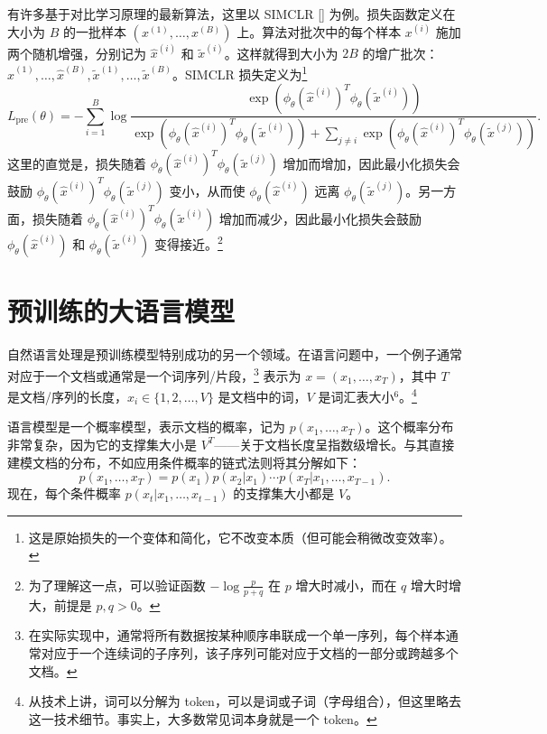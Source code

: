 有许多基于对比学习原理的最新算法，这里以 SIMCLR [\cite{chen2020simple}] 为例。损失函数定义在大小为 $B$ 的一批样本 $(x^{(1)}, \dots, x^{(B)})$ 上。算法对批次中的每个样本 $x^{(i)}$ 施加两个随机增强，分别记为 $\hat{x}^{(i)}$ 和 $\tilde{x}^{(i)}$。这样就得到大小为 $2B$ 的增广批次：$\hat{x}^{(1)}, \dots, \hat{x}^{(B)}, \tilde{x}^{(1)}, \dots, \tilde{x}^{(B)}$。SIMCLR 损失定义为\footnote{这是原始损失的一个变体和简化，它不改变本质（但可能会稍微改变效率）。
}
\[
    L_{\text{pre}}(\theta) = - \sum_{i=1}^B \log \frac{\exp(\phi_\theta(\hat{x}^{(i)})^T \phi_\theta(\tilde{x}^{(i)}))}{\exp(\phi_\theta(\hat{x}^{(i)})^T \phi_\theta(\tilde{x}^{(i)})) + \sum_{j \neq i} \exp(\phi_\theta(\hat{x}^{(i)})^T \phi_\theta(\tilde{x}^{(j)}))}.
\]
这里的直觉是，损失随着 $\phi_\theta(\hat{x}^{(i)})^T \phi_\theta(\tilde{x}^{(j)})$ 增加而增加，因此最小化损失会鼓励 $\phi_\theta(\hat{x}^{(i)})^T \phi_\theta(\tilde{x}^{(j)})$ 变小，从而使 $\phi_\theta(\hat{x}^{(i)})$ 远离 $\phi_\theta(\tilde{x}^{(j)})$。另一方面，损失随着 $\phi_\theta(\hat{x}^{(i)})^T \phi_\theta(\tilde{x}^{(i)})$ 增加而减少，因此最小化损失会鼓励 $\phi_\theta(\hat{x}^{(i)})$ 和 $\phi_\theta(\tilde{x}^{(i)})$ 变得接近。\footnote{为了理解这一点，可以验证函数 $-\log \frac{p}{p+q}$ 在 $p$ 增大时减小，而在 $q$ 增大时增大，前提是 $p, q > 0$。}


\section{预训练的大语言模型}

自然语言处理是预训练模型特别成功的另一个领域。在语言问题中，一个例子通常对应于一个文档或通常是一个词序列/片段，\footnote{在实际实现中，通常将所有数据按某种顺序串联成一个单一序列，每个样本通常对应于一个连续词的子序列，该子序列可能对应于文档的一部分或跨越多个文档。} 表示为 $x = (x_1, \dots, x_T)$，其中 $T$ 是文档/序列的长度，$x_i \in \{1, 2, \dots, V\}$ 是文档中的词，$V$ 是词汇表大小$^{6}$。\footnote{从技术上讲，词可以分解为 token，可以是词或子词（字母组合），但这里略去这一技术细节。事实上，大多数常见词本身就是一个 token。}

语言模型是一个概率模型，表示文档的概率，记为 $p(x_1, \dots, x_T)$。这个概率分布非常复杂，因为它的支撑集大小是 $V^T$——关于文档长度呈指数级增长。与其直接建模文档的分布，不如应用条件概率的链式法则将其分解如下：
\begin{equation} 
    p(x_1, \dots, x_T) = p(x_1)p(x_2|x_1)\cdots p(x_T|x_1, \dots, x_{T-1}).\label{eq:14.5}
\end{equation}
现在，每个条件概率 $p(x_t|x_1, \dots, x_{t-1})$ 的支撑集大小都是 $V$。

